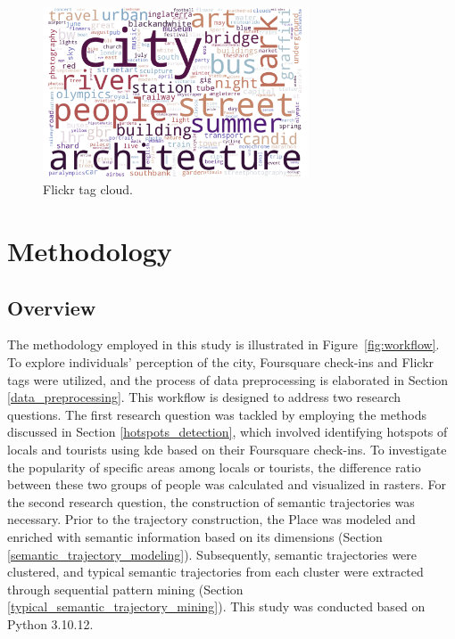 \documentclass{article}
\begin{document}
\begin{figure}[h!]
\centering
\includegraphics[width=0.7\textwidth]{figures/flickr_tag_cloud.png}
\caption{\label{fig:flickr_tag_cloud}Flickr tag cloud.}
\end{figure}


\clearpage


\section{Methodology}

\subsection{Overview}
The methodology employed in this study is illustrated in Figure~\ref{fig:workflow}. To explore individuals' perception of the city, Foursquare check-ins and Flickr tags were utilized, and the process of data preprocessing is elaborated in Section \ref{data_preprocessing}. This workflow is designed to address two research questions. The first research question was tackled by employing the methods discussed in Section \ref{hotspots_detection}, which involved identifying hotspots of locals and tourists using \acrfull{kde} based on their Foursquare check-ins. To investigate the popularity of specific areas among locals or tourists, the difference ratio between these two groups of people was calculated and visualized in rasters. For the second research question, the construction of semantic trajectories was necessary. Prior to the trajectory construction, the Place was modeled and enriched with semantic information based on its dimensions (Section \ref{semantic_trajectory_modeling}). Subsequently, semantic trajectories were clustered, and typical semantic trajectories from each cluster were extracted through sequential pattern mining (Section \ref{typical_semantic_trajectory_mining}). This study was conducted based on Python 3.10.12.
\end{document}
